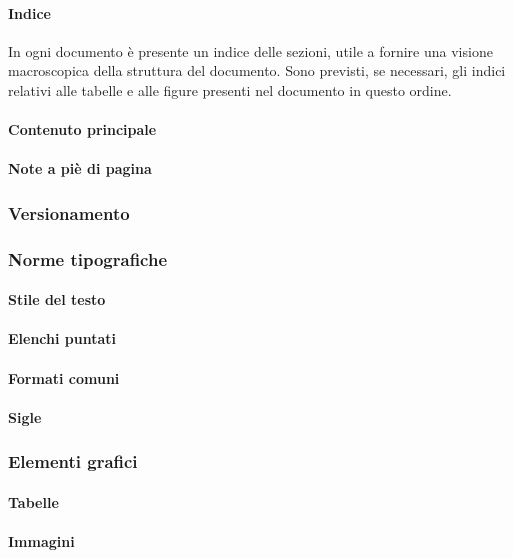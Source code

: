  \paragraph{Indice}
 In ogni documento è presente un indice delle sezioni, utile a fornire una visione macroscopica della struttura del documento. Sono previsti, se necessari, gli indici relativi alle tabelle e alle figure presenti nel documento in questo ordine.
 \paragraph{Contenuto principale}
 \paragraph{Note a piè di pagina}
 
\subsubsection{Versionamento}

\subsubsection{Norme tipografiche}
 \paragraph{Stile del testo} 
 \paragraph{Elenchi puntati}
 \paragraph{Formati comuni}
 \paragraph{Sigle}
 
\subsubsection{Elementi grafici}
 \paragraph{Tabelle} 
 \paragraph{Immagini}

